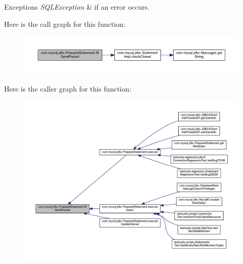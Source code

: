 \begin{DoxyExceptions}{Exceptions}
{\em S\+Q\+L\+Exception} & if an error occurs. \\
\hline
\end{DoxyExceptions}
Here is the call graph for this function\+:
\nopagebreak
\begin{figure}[H]
\begin{center}
\leavevmode
\includegraphics[width=350pt]{classcom_1_1mysql_1_1jdbc_1_1_prepared_statement_a0f1235a6e911d9370ef27e6ba5932d89_cgraph}
\end{center}
\end{figure}
Here is the caller graph for this function\+:
\nopagebreak
\begin{figure}[H]
\begin{center}
\leavevmode
\includegraphics[width=350pt]{classcom_1_1mysql_1_1jdbc_1_1_prepared_statement_a0f1235a6e911d9370ef27e6ba5932d89_icgraph}
\end{center}
\end{figure}
\mbox{\label{classcom_1_1mysql_1_1jdbc_1_1_prepared_statement_a7012604554fada055dce8c36ece28ac7}} 
